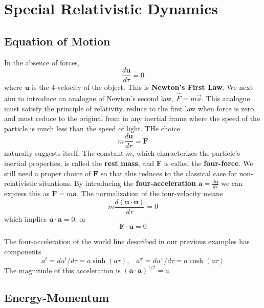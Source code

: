 \section{Special Relativistic Dynamics}
\label{sec:RelDyn}

\subsection{Equation of Motion}

In the absence of forces, $$\frac{d\mathbf{u}}{d\tau} = 0$$
where $\mathbf{u}$ is the $4$-velocity of the object. This is \textbf{Newton's First Law}. We next aim to introduce an analogue of Newton's second law, $\vec{F} = m\vec{a}$. This analogue must satisfy the principle of relativity, reduce to the first law when force is zero, and must reduce to the original from in any inertial frame where the speed of the particle is much less than the speed of light. THe choice \begin{equation*}
    \boxed{m\frac{d\mathbf{u}}{d\tau} = \mathbf{F}}
\end{equation*}
naturally suggests itself. The constant $m$, which characterizes the particle's inertial properties, is called the \textbf{rest mass}, and $\mathbf{F}$ is called the \textbf{four-force}. We still need a proper choice of $\mathbf{F}$ so that this reduces to the classical case for non-relativistic situations. By introducing the \textbf{four-acceleration} $\mathbf{a} = \frac{d\mathbf{u}}{d\tau}$ we can express this as $\mathbf{F} = m\mathbf{a}$. The normalization of the four-velocity means $$m\frac{d(\mathbf{u}\cdot\mathbf{u})}{d\tau} = 0$$
which implies $\mathbf{u}\cdot\mathbf{a} = 0$, or $$\mathbf{F}\cdot\mathbf{u} = 0$$

\begin{eg}
    The four-acceleration of the world line described in our previous examples has components $$a^t = du^t/d\tau = a\sinh(a\tau),\;\;\; a^x = du^x/d\tau = a\cosh(a\tau)$$
    The magnitude of this acceleration is $(\mathbf{a}\cdot\mathbf{a})^{1/2} = a$.
\end{eg}

\subsection{Energy-Momentum}

